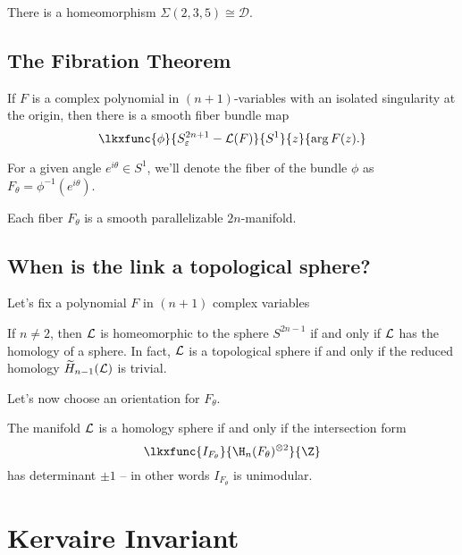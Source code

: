 \begin{proposition}
	There is a homeomorphism $\Sigma(2,3,5)\cong \mathscr{D}$.
\end{proposition}

\subsection*{The Fibration Theorem}

\begin{theorem}\label{thm:fibration}
	If $F$ is a complex polynomial in $(n+1)$-variables with an isolated singularity at the origin, then there is a smooth fiber bundle map
	\[
		\lkxfunc{\phi}{S^{2n+1}_\varepsilon - \L(F)}{S^1}{z}{\arg F(z).}
	\]
\end{theorem}

For a given angle $e^{i\theta}\in S^1$, we'll denote the fiber of the bundle $\phi$ as $F_\theta = \phi^{-1}(e^{i\theta})$.

\begin{proposition}
  Each fiber $F_\theta$ is a smooth parallelizable $2n$-manifold.
\end{proposition}

\subsection*{When is the link a topological sphere?}

Let's fix a polynomial $F$ in $(n+1)$ complex variables

\begin{proposition}
  If $n\neq 2$, then $\mathcal{L}$ is homeomorphic to the sphere $S^{2n-1}$ if and only if $\mathcal{L}$ has the homology of a sphere. In fact, $\mathcal{L}$ is a topological sphere if and only if the reduced homology $\widetilde{H}_{n-1}(\mathcal{L})$ is trivial.
\end{proposition}

Let's now choose an orientation for $F_\theta$.

\begin{proposition}
  The manifold $\mathcal{L}$ is a homology sphere if and only if the intersection form
  \[
    \lkxfunc{I_{F_\theta}}{\H_n(F_\theta)^{\otimes 2}}{\Z}
  \]
  has determinant $\pm 1$ -- in other words $I_{F_\theta}$ is unimodular.
\end{proposition}

\section{Kervaire Invariant}

